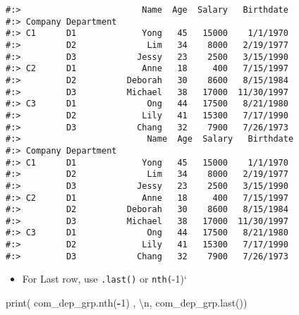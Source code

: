 \documentclass[
]{book}
\newenvironment{Shaded}{\begin{snugshade}}{\end{snugshade}}
\newcommand{\BuiltInTok}[1]{#1}
\newcommand{\CharTok}[1]{\textcolor[rgb]{0.5,0.5,0.5}{#1}}
\newcommand{\DecValTok}[1]{\textcolor[rgb]{0.06,0.06,0.06}{#1}}
\newcommand{\NormalTok}[1]{#1}
\newcommand{\OperatorTok}[1]{\textcolor[rgb]{0.43,0.43,0.43}{\textbf{#1}}}
\newcommand{\StringTok}[1]{\textcolor[rgb]{0.5,0.5,0.5}{#1}}
\providecommand{\tightlist}{%
  \setlength{\itemsep}{0pt}\setlength{\parskip}{0pt}}
\begin{document}
\begin{verbatim}
#:>                        Name  Age  Salary   Birthdate
#:> Company Department                                  
#:> C1      D1             Yong   45   15000    1/1/1970
#:>         D2              Lim   34    8000   2/19/1977
#:>         D3            Jessy   23    2500   3/15/1990
#:> C2      D1             Anne   18     400   7/15/1997
#:>         D2          Deborah   30    8600   8/15/1984
#:>         D3          Michael   38   17000  11/30/1997
#:> C3      D1              Ong   44   17500   8/21/1980
#:>         D2             Lily   41   15300   7/17/1990
#:>         D3            Chang   32    7900   7/26/1973 
#:>                         Name  Age  Salary   Birthdate
#:> Company Department                                  
#:> C1      D1             Yong   45   15000    1/1/1970
#:>         D2              Lim   34    8000   2/19/1977
#:>         D3            Jessy   23    2500   3/15/1990
#:> C2      D1             Anne   18     400   7/15/1997
#:>         D2          Deborah   30    8600   8/15/1984
#:>         D3          Michael   38   17000  11/30/1997
#:> C3      D1              Ong   44   17500   8/21/1980
#:>         D2             Lily   41   15300   7/17/1990
#:>         D3            Chang   32    7900   7/26/1973
\end{verbatim}

\begin{itemize}
\tightlist
\item
  For Last row, use \texttt{.last()} or \texttt{nth(}-1)`
\end{itemize}

\begin{Shaded}
\begin{Highlighting}[]
\BuiltInTok{print}\NormalTok{( com\_dep\_grp.nth(}\OperatorTok{{-}}\DecValTok{1}\NormalTok{)  , }\StringTok{\textquotesingle{}}\CharTok{\textbackslash{}n}\StringTok{\textquotesingle{}}\NormalTok{,}
\NormalTok{       com\_dep\_grp.last())}
\end{Highlighting}
\end{Shaded}
\end{document}
